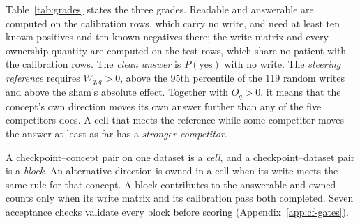 \documentclass[11pt]{article}
\begin{document}
\par\vspace{\intextsep}\noindent\begin{minipage}{\linewidth}
\makeatletter{}\makeatother
\centering
\small
\setlength{\tabcolsep}{3pt}
\caption{\textbf{The three RAW grades.} The data each grade is computed on and the condition under which a concept passes it.}
\label{tab:grades}
\end{minipage}\par\vspace{\intextsep}

Table~\ref{tab:grades} states the three grades. Readable and answerable are computed on the calibration rows, which carry no write, and need at least ten known positives and ten known negatives there; the write matrix and every ownership quantity are computed on the test rows, which share no patient with the calibration rows. The \emph{clean answer} is $P(\mathrm{yes})$ with no write. The \emph{steering reference} requires $W_{q,q}>0$, above the 95th percentile of the 119 random writes and above the sham's absolute effect. Together with $O_q>0$, it means that the concept's own direction moves its own answer further than any of the five competitors does. A cell that meets the reference while some competitor moves the answer at least as far has a \emph{stronger competitor}.

A checkpoint--concept pair on one dataset is a \emph{cell}, and a checkpoint--dataset pair is a \emph{block}. An alternative direction is owned in a cell when its write meets the same rule for that concept. A block contributes to the answerable and owned counts only when its write matrix and its calibration pass both completed. Seven acceptance checks validate every block before scoring (Appendix~\ref{app:cf-gates}).
\label{sec:gates}
\end{document}
